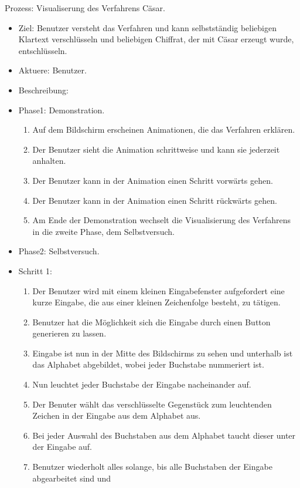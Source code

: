 \documentclass{article}
\begin{document}
\begin{FA}[start=100]
 \item Prozess: Visualiserung des Verfahrens Cäsar.
\end{FA}
\begin{itemize}[label={}]
 \item Ziel: Benutzer versteht das Verfahren und kann selbstständig 
 beliebigen Klartext verschlüsseln und beliebigen Chiffrat, der mit Cäsar erzeugt wurde, entschlüsseln.
 \item Aktuere: Benutzer.
 \item Beschreibung:
 \item Phase1: Demonstration.
\begin{enumerate}[]
 \item Auf dem Bildschirm erscheinen Animationen, die das Verfahren erklären.
 \item Der Benutzer sieht die Animation schrittweise und kann sie jederzeit anhalten.
 \item Der Benutzer kann in der Animation einen Schritt vorwärts gehen.
 \item Der Benutzer kann in der Animation einen Schritt rückwärts gehen. 
 \item Am Ende der Demonstration wechselt die Visualisierung des Verfahrens in die zweite Phase, dem Selbstversuch.
\end{enumerate}
 \item Phase2: Selbstversuch.
 \item Schritt 1:
 \begin{enumerate}
  \item Der Benutzer wird mit einem kleinen Eingabefenster aufgefordert eine kurze Eingabe, 
        die aus einer kleinen Zeichenfolge besteht, zu tätigen.
  \item Benutzer hat die Möglichkeit sich die Eingabe durch einen Button generieren zu lassen.
  \item Eingabe ist nun in der Mitte des Bildschirms zu sehen und unterhalb ist das Alphabet 
        abgebildet, wobei jeder Buchstabe nummeriert ist.     
  \item Nun leuchtet jeder Buchstabe der Eingabe nacheinander auf.
  \item Der Benuter wählt das verschlüsselte Gegenstück zum leuchtenden Zeichen in der Eingabe aus dem Alphabet aus. 
  \item Bei jeder Auswahl des Buchstaben aus dem Alphabet taucht dieser unter der Eingabe auf.
  \item[] Benutzer wiederholt alles solange, bis alle Buchstaben der Eingabe abgearbeitet sind und 

\end{enumerate}
\end{itemize}
\end{document}

